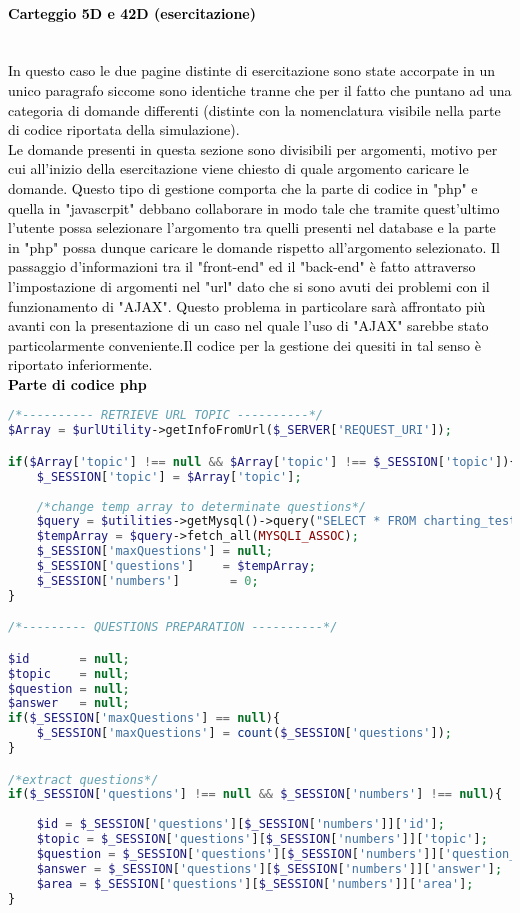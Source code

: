 \paragraph{\textcolor{black}{Carteggio 5D e 42D (esercitazione)}}\leavevmode\\
\textcolor{black}{In questo caso le due pagine distinte di esercitazione sono state accorpate in un unico paragrafo siccome sono identiche tranne che per il fatto che puntano ad una categoria di domande differenti (distinte con la nomenclatura visibile nella parte di codice riportata della simulazione).\\
Le domande presenti in questa sezione sono divisibili per argomenti, motivo per cui all'inizio della esercitazione viene chiesto di quale argomento caricare le domande. Questo tipo di gestione comporta che la parte di codice in "php" e quella in "javascrpit" debbano collaborare in modo tale che tramite quest'ultimo l'utente possa selezionare l'argomento tra quelli presenti nel database e la parte in "php" possa dunque caricare le domande rispetto all'argomento selezionato. Il passaggio d'informazioni tra il "front-end" ed il "back-end" è fatto attraverso l'impostazione di argomenti nel "url" dato che si sono avuti dei problemi con il funzionamento di "AJAX". Questo problema in particolare sarà affrontato più avanti con la presentazione di un caso nel quale l'uso di "AJAX" sarebbe stato particolarmente conveniente.Il codice per la gestione dei quesiti in tal senso è riportato inferiormente.}\\

\textbf{\textcolor{black}{Parte di codice php}}\\

\begin{lstlisting}[language=php]
/*---------- RETRIEVE URL TOPIC ----------*/
$Array = $urlUtility->getInfoFromUrl($_SERVER['REQUEST_URI']);

if($Array['topic'] !== null && $Array['topic'] !== $_SESSION['topic']){
	$_SESSION['topic'] = $Array['topic'];
	
	/*change temp array to determinate questions*/
	$query = $utilities->getMysql()->query("SELECT * FROM charting_test_5d WHERE (topic = '{$Array['topic']}')");
	$tempArray = $query->fetch_all(MYSQLI_ASSOC);
	$_SESSION['maxQuestions'] = null;
	$_SESSION['questions']    = $tempArray;
	$_SESSION['numbers']       = 0;
}

/*--------- QUESTIONS PREPARATION ----------*/

$id       = null;
$topic    = null;
$question = null;
$answer   = null;
if($_SESSION['maxQuestions'] == null){
	$_SESSION['maxQuestions'] = count($_SESSION['questions']);
}

/*extract questions*/
if($_SESSION['questions'] !== null && $_SESSION['numbers'] !== null){
	
	$id = $_SESSION['questions'][$_SESSION['numbers']]['id'];
	$topic = $_SESSION['questions'][$_SESSION['numbers']]['topic'];
	$question = $_SESSION['questions'][$_SESSION['numbers']]['question_text'];
	$answer = $_SESSION['questions'][$_SESSION['numbers']]['answer'];
	$area = $_SESSION['questions'][$_SESSION['numbers']]['area'];	
}
\end{lstlisting}

